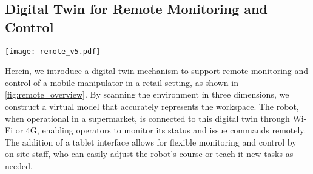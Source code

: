 \subsection{Digital Twin for Remote Monitoring and Control}
\label{sec:digital_twin}

\begin{figure*}[t]
  \begin{center}
    \texttt{[image: remote\_v5.pdf]}
  \end{center}
  \caption{Overview of the remote monitoring and control
  system. a) Laptop-based remote interface for monitoring
  and control system; b) Visualization of the robot within
  the actual retail environment; c) Tablet interface for
  on-the-go monitoring and task programming.}
  \label{fig:remote_overview}
\end{figure*}

Herein, we introduce a digital twin mechanism to support
remote monitoring and control of a mobile manipulator in a
retail setting, as shown in \cref{fig:remote_overview}. By
scanning the environment in three dimensions, we construct a
virtual model that accurately represents the workspace. The
robot, when operational in a supermarket, is connected to
this digital twin through Wi-Fi or 4G, enabling operators to
monitor its status and issue commands remotely. The addition of a tablet interface allows for
flexible monitoring and control by on-site staff, who can
easily adjust the robot's course or teach it new tasks as
needed.



